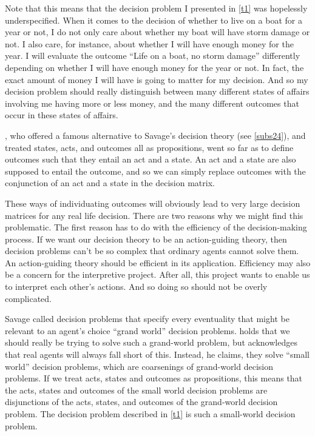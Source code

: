 Note that this means that the decision problem I presented in \autoref{t1} was hopelessly underspecified. When it comes to the decision of whether to live on a boat for a year or not, I do not only care about whether my boat will have storm damage or not. I also care, for instance, about whether I will have enough money for the year. I will evaluate the outcome ``Life on a boat, no storm damage'' differently depending on whether I will have enough money for the year or not. In fact, the exact amount of money I will have is going to matter for my decision. And so my decision problem should really distinguish between many different states of affairs involving me having more or less money, and the many different outcomes that occur in these states of affairs.

\citet{Jeffrey1983}, who offered a famous alternative to Savage's decision theory (see \autoref{subs24}), and treated states, acts, and outcomes all as propositions, went so far as to define outcomes such that they entail an act and a state. An act and a state are also supposed to entail the outcome, and so we can simply replace outcomes with the conjunction of an act and a state in the decision matrix.

These ways of individuating outcomes will obviously lead to very large decision matrices for any real life decision. There are two reasons why we might find this problematic. The first reason has to do with the efficiency of the decision-making process. If we want our decision theory to be an action-guiding theory, then decision problems can't be so complex that ordinary agents cannot solve them. An action-guiding theory should be efficient in its application. Efficiency may also be a concern for the interpretive project. After all, this project wants to enable us to interpret each other's actions. And so doing so should not be overly complicated.

Savage called decision problems that specify every eventuality that might be relevant to an agent's choice ``grand world'' decision problems. \citet{Joyce1999} holds that we should really be trying to solve such a grand-world problem, but acknowledges that real agents will always fall short of this. Instead, he claims, they solve ``small world'' decision problems, which are coarsenings of grand-world decision problems. If we treat acts, states and outcomes as propositions, this means that the acts, states and outcomes of the small world decision problems are disjunctions of the acts, states, and outcomes of the grand-world decision problem. The decision problem described in \autoref{t1} is such a small-world decision problem.

